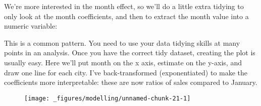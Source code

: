 We're more interested in the month effect, so we'll do a little extra
tidying to only look at the month coefficients, and then to extract the
month value into a numeric variable:

\begin{Shaded}
\end{Shaded}

This is a common pattern. You need to use your data tidying skills at
many points in an analysis. Once you have the correct tidy dataset,
creating the plot is usually easy. Here we'll put month on the x axis,
estimate on the y-axis, and draw one line for each city. I've
back-transformed (exponentiated) to make the coefficients more
interpretable: these are now ratios of sales compared to January.

\begin{Shaded}
\begin{Highlighting}[]
\StringTok{  }\NormalTok{(}\NormalTok{(} 
\end{Highlighting}
\end{Shaded}

\begin{figure}[H]
  \centering
  \texttt{[image: \_figures/modelling/unnamed-chunk-21-1]}
\end{figure}

